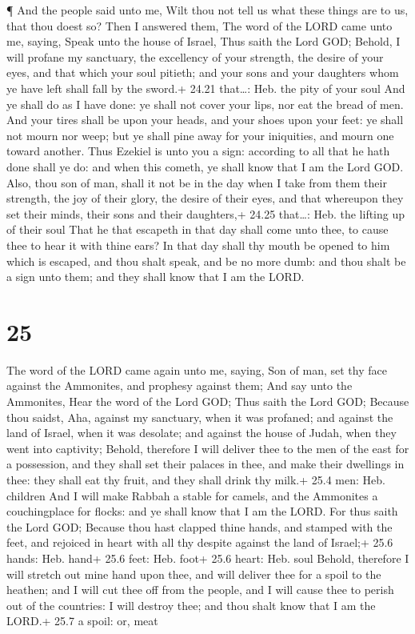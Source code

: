  ¶ And the people said unto me, Wilt thou not tell us what
these things are to us, that thou doest so?  Then I
answered them, The word of the LORD came unto me, saying, 
Speak unto the house of Israel, Thus saith the Lord GOD; Behold, I will
profane my sanctuary, the excellency of your strength, the desire of
your eyes, and that which your soul pitieth; and your sons and your
daughters whom ye have left shall fall by the sword.+ 24.21 that\ldots:
Heb. the pity of your soul  And ye shall do as I have done:
ye shall not cover your lips, nor eat the bread of men. 
And your tires shall be upon your heads, and your shoes upon your feet:
ye shall not mourn nor weep; but ye shall pine away for your iniquities,
and mourn one toward another.  Thus Ezekiel is unto you a
sign: according to all that he hath done shall ye do: and when this
cometh, ye shall know that I am the Lord GOD.  Also, thou
son of man, shall it not be in the day when I take from them their
strength, the joy of their glory, the desire of their eyes, and that
whereupon they set their minds, their sons and their daughters,+ 24.25
that\ldots: Heb. the lifting up of their soul  That he that
escapeth in that day shall come unto thee, to cause thee to hear it with
thine ears?  In that day shall thy mouth be opened to him
which is escaped, and thou shalt speak, and be no more dumb: and thou
shalt be a sign unto them; and they shall know that I am the LORD.

\hypertarget{section-24}{%
\section{25}\label{section-24}}

 The word of the LORD came again unto me, saying,
 Son of man, set thy face against the Ammonites, and
prophesy against them;  And say unto the Ammonites, Hear the
word of the Lord GOD; Thus saith the Lord GOD; Because thou saidst, Aha,
against my sanctuary, when it was profaned; and against the land of
Israel, when it was desolate; and against the house of Judah, when they
went into captivity;  Behold, therefore I will deliver thee
to the men of the east for a possession, and they shall set their
palaces in thee, and make their dwellings in thee: they shall eat thy
fruit, and they shall drink thy milk.+ 25.4 men: Heb. children
 And I will make Rabbah a stable for camels, and the
Ammonites a couchingplace for flocks: and ye shall know that I am the
LORD.  For thus saith the Lord GOD; Because thou hast
clapped thine hands, and stamped with the feet, and rejoiced in heart
with all thy despite against the land of Israel;+ 25.6 hands: Heb. hand+
25.6 feet: Heb. foot+ 25.6 heart: Heb. soul  Behold,
therefore I will stretch out mine hand upon thee, and will deliver thee
for a spoil to the heathen; and I will cut thee off from the people, and
I will cause thee to perish out of the countries: I will destroy thee;
and thou shalt know that I am the LORD.+ 25.7 a spoil: or, meat

